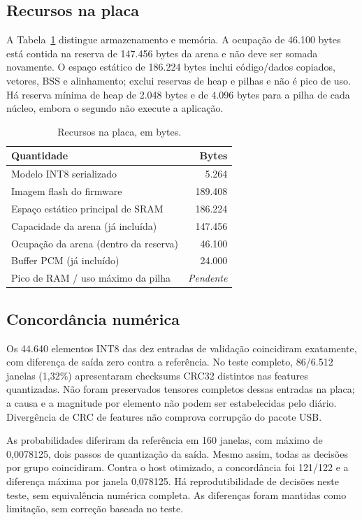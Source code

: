 \documentclass[9pt,twocolumn,twoside,lineno]{MSBJournal}
\newcommand{\pending}{\textit{Pendente}}
\begin{document}
\subsection{Recursos na placa}
A Tabela~\ref{tab:resources} distingue armazenamento e memória. A ocupação de 46.100 bytes está contida na reserva de 147.456 bytes da arena e não deve ser somada novamente. O espaço estático de 186.224 bytes inclui código/dados copiados, vetores, BSS e alinhamento; exclui reservas de heap e pilhas e não é pico de uso. Há reserva mínima de heap de 2.048 bytes e de 4.096 bytes para a pilha de cada núcleo, embora o segundo não execute a aplicação.
\begin{table}[t]\centering
\caption{Recursos na placa, em bytes.}\label{tab:resources}
\begin{tabular}{p{}r}\toprule
Quantidade & Bytes\\\midrule
Modelo INT8 serializado & 5.264\\
Imagem flash do firmware & 189.408\\
Espaço estático principal de SRAM & 186.224\\
Capacidade da arena (já incluída) & 147.456\\
Ocupação da arena (dentro da reserva) & 46.100\\
Buffer PCM (já incluído) & 24.000\\
Pico de RAM / uso máximo da pilha & \pending\\\bottomrule
\end{tabular}\end{table}

\subsection{Concordância numérica}
Os 44.640 elementos INT8 das dez entradas de validação coincidiram exatamente, com diferença de saída zero contra a referência. No teste completo, 86/6.512 janelas (1,32\%) apresentaram checksums CRC32 distintos nas features quantizadas. Não foram preservados tensores completos dessas entradas na placa; a causa e a magnitude por elemento não podem ser estabelecidas pelo diário. Divergência de CRC de features não comprova corrupção do pacote USB.

As probabilidades diferiram da referência em 160 janelas, com máximo de 0,0078125, dois passos de quantização da saída. Mesmo assim, todas as decisões por grupo coincidiram. Contra o host otimizado, a concordância foi 121/122 e a diferença máxima por janela 0,078125. Há reprodutibilidade de decisões neste teste, sem equivalência numérica completa. As diferenças foram mantidas como limitação, sem correção baseada no teste.
\end{document}
